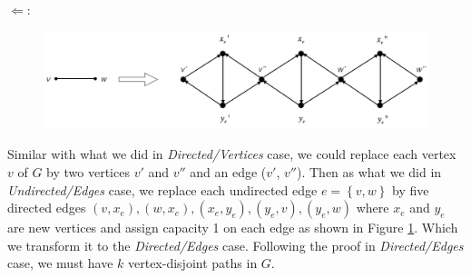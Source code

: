 \begin{enumerate}
	$\Leftarrow$:
	\begin{figure}[h]
	\centering
	\includegraphics[scale=0.4]{hw4p5c}
	\caption{}
	\label{fig:p5c}
	\end{figure}
	Similar with what we did in \textit{Directed/Vertices} case, we could replace each vertex $v$ of $G$ by two vertices $v'$ and $v''$ and an edge ($v'$, $v''$). Then as what we did in \textit{Undirected/Edges} case, we replace each undirected edge $e = \left\{ v, w \right\}$  by five directed edges $(v, x_e), (w, x_e), (x_e, y_e), (y_e, v), (y_e, w)$ where $x_e$ and $y_e$ are new vertices and assign capacity 1 on each edge as shown in Figure \ref{fig:p5c}. Which we transform it to the \textit{Directed/Edges} case. Following the proof in \textit{Directed/Edges} case, we must have $k$ vertex-disjoint paths in $G$.
\end{enumerate}